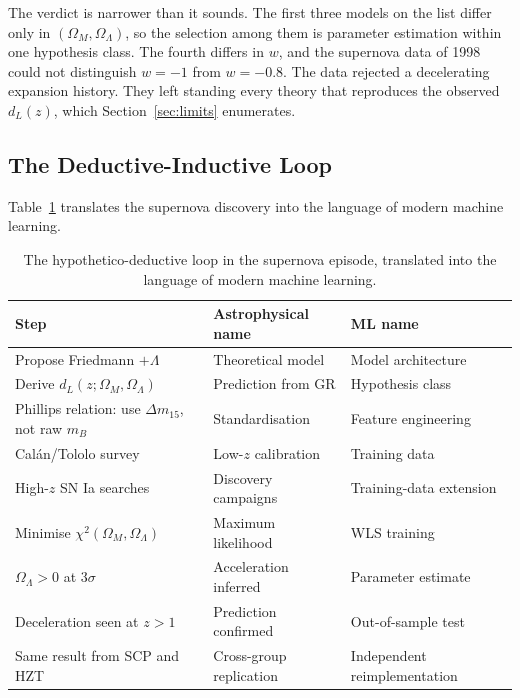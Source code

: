 \documentclass[12pt]{article}
\begin{document}
The verdict is narrower than it sounds.  The first three models on the list
differ only in $(\Omega_M,\Omega_\Lambda)$, so the selection among them is
parameter estimation within one hypothesis class.  The fourth differs in $w$,
and the supernova data of 1998 could not distinguish $w = -1$ from
$w = -0.8$.  The data rejected a decelerating expansion history.  They left
standing every theory that reproduces the observed $d_L(z)$, which
Section~\ref{sec:limits} enumerates.

\subsection{The Deductive-Inductive Loop}

Table~\ref{tab:loop} translates the supernova discovery into the language
of modern machine learning.

\begin{table}[ht]
\centering
\caption{The hypothetico-deductive loop in the supernova episode,
translated into the language of modern machine learning.}
\label{tab:loop}
\begin{tabular}{p{3.6cm}p{4.0cm}p{4.0cm}}
\toprule
Step & Astrophysical name & ML name \\
\midrule
Propose Friedmann $+\Lambda$ & Theoretical model & Model architecture \\
Derive $d_L(z;\Omega_M,\Omega_\Lambda)$ & Prediction from GR &
  Hypothesis class \\
Phillips relation: use $\Delta m_{15}$, not raw $m_B$ &
  Standardisation & Feature engineering \\
Cal\'an/Tololo survey & Low-$z$ calibration &
  Training data \\
High-$z$ SN Ia searches & Discovery campaigns &
  Training-data extension \\
Minimise $\chi^2(\Omega_M,\Omega_\Lambda)$ & Maximum likelihood &
  WLS training \\
$\Omega_\Lambda > 0$ at $3\sigma$ & Acceleration inferred &
  Parameter estimate \\
Deceleration seen at $z>1$ & Prediction confirmed &
  Out-of-sample test \\
Same result from SCP and HZT & Cross-group replication &
  Independent reimplementation \\
\bottomrule
\end{tabular}
\end{table}

\end{document}
